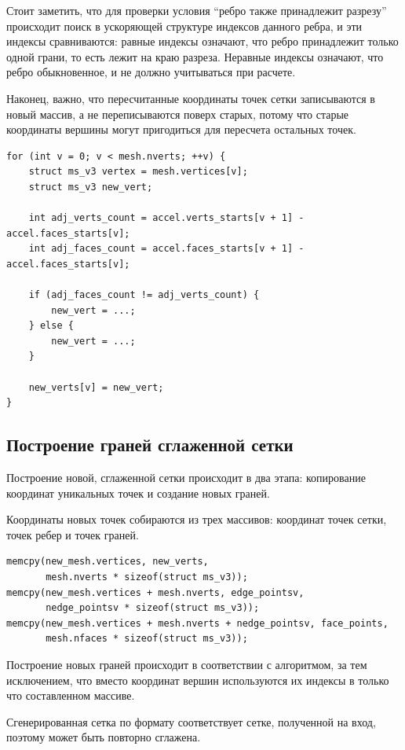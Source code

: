 \documentclass[14pt]{extarticle}
\begin{document}
Стоит заметить, что для проверки условия ``ребро также принадлежит разрезу'' происходит поиск в ускоряющей структуре индексов данного ребра, и эти индексы сравниваются: равные индексы означают, что ребро принадлежит только одной грани, то есть лежит на краю разреза. Неравные индексы означают, что ребро обыкновенное, и не должно учитываться при расчете.

Наконец, важно, что пересчитанные координаты точек сетки записываются в новый массив, а не переписываются поверх старых, потому что старые координаты вершины могут пригодиться для пересчета остальных точек.
\begin{lstlisting}[caption={Пересчет координат точек сетки}, captionpos=b]
for (int v = 0; v < mesh.nverts; ++v) {
    struct ms_v3 vertex = mesh.vertices[v];
    struct ms_v3 new_vert;
       
    int adj_verts_count = accel.verts_starts[v + 1] - accel.faces_starts[v];
    int adj_faces_count = accel.faces_starts[v + 1] - accel.faces_starts[v];
        
    if (adj_faces_count != adj_verts_count) {
        new_vert = ...;
    } else {
        new_vert = ...;
    }

    new_verts[v] = new_vert;
}
\end{lstlisting}


\subsection{Построение граней сглаженной сетки}
Построение новой, сглаженной сетки происходит в два этапа: копирование координат уникальных точек и создание новых граней.

Координаты новых точек собираются из трех массивов: координат точек сетки, точек ребер и точек граней.
\begin{lstlisting}[caption={Сборка нового массива координат}, captionpos=b]
memcpy(new_mesh.vertices, new_verts,
       mesh.nverts * sizeof(struct ms_v3));
memcpy(new_mesh.vertices + mesh.nverts, edge_pointsv,
       nedge_pointsv * sizeof(struct ms_v3));
memcpy(new_mesh.vertices + mesh.nverts + nedge_pointsv, face_points,
       mesh.nfaces * sizeof(struct ms_v3));
\end{lstlisting}

Построение новых граней происходит в соответствии с алгоритмом, за тем исключением, что вместо координат вершин используются их индексы в только что составленном массиве.

Сгенерированная сетка по формату соответствует сетке, полученной на вход, поэтому может быть повторно сглажена.
\end{document}
